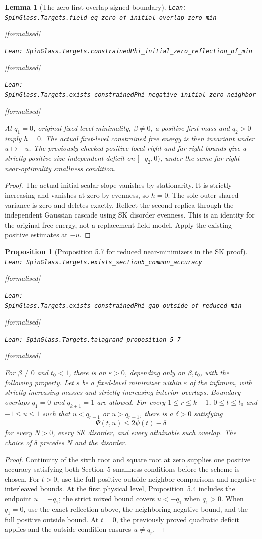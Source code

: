 \documentclass[11pt]{article}
\providecommand{\lean}[1]{\leavevmode\par\nopagebreak
  {\noindent\normalfont\footnotesize\raggedright\texttt{Lean: #1}\par}\nopagebreak}
\providecommand{\leanok}{\par\nopagebreak
  {\noindent\normalfont\footnotesize\textcolor{green!50!black}{[formalised]}\par}\nopagebreak}
\newtheorem{proposition}[theorem]{Proposition}
\newtheorem{lemma}[theorem]{Lemma}
\begin{document}
\begin{lemma}[The zero-first-overlap signed boundary]
\lean{SpinGlass.Targets.field\_eq\_zero\_of\_initial\_overlap\_zero\_min}\leanok
\lean{SpinGlass.Targets.constrainedPhi\_initial\_zero\_reflection\_of\_min}\leanok
\lean{SpinGlass.Targets.exists\_constrainedPhi\_negative\_initial\_zero\_neighbor}\leanok
At $q_1=0$, original fixed-level minimality, $\beta\ne0$, a positive
first mass and $q_2>0$ imply $h=0$. The actual first-level constrained
free energy is then invariant under $u\mapsto-u$. The previously checked
positive local-right and far-right bounds give a strictly positive
size-independent deficit on $[-q_2,0)$, under the same far-right
near-optimality smallness condition.
\end{lemma}
\begin{proof}
The actual initial scalar slope vanishes by stationarity. It is strictly
increasing and vanishes at zero by evenness, so $h=0$. The sole outer
shared variance is zero and deletes exactly. Reflect the second replica
through the independent Gaussian cascade using SK disorder evenness.
This is an identity for the original free energy, not a replacement field
model. Apply the existing positive estimates at $-u$.
\end{proof}

\begin{proposition}[Proposition 5.7 for reduced near-minimizers in the SK proof]
\lean{SpinGlass.Targets.exists\_section5\_common\_accuracy}\leanok
\lean{SpinGlass.Targets.exists\_constrainedPhi\_gap\_outside\_of\_reduced\_min}\leanok
\lean{SpinGlass.Targets.talagrand\_proposition\_5\_7}\leanok
For $\beta\ne0$ and $t_0<1$, there is an $\varepsilon>0$, depending
only on $\beta,t_0$, with the following property. Let $s$ be a fixed-level
minimizer within $\varepsilon$ of the infimum, with strictly increasing
masses and strictly increasing interior overlaps. Boundary overlaps
$q_1=0$ and $q_{k+1}=1$ are allowed. For every $1\le r\le k+1$,
$0\le t\le t_0$ and $-1\le u\le1$ such that
$u<q_{r-1}$ or $u>q_{r+1}$, there is a $\delta>0$ satisfying
\[
  \Psi(t,u)\le 2\psi(t)-\delta
\]
for every $N>0$, every SK disorder, and every attainable such overlap.
The choice of $\delta$ precedes $N$ and the disorder.
\end{proposition}
\begin{proof}
Continuity of the sixth root and square root at zero supplies one positive
accuracy satisfying both Section~5 smallness conditions before the scheme
is chosen. For $t>0$, use the full positive outside-neighbor comparisons
and negative interleaved bounds. At the first physical level, Proposition~5.4
includes the endpoint $u=-q_1$; the strict mixed bound covers $u<-q_1$
when $q_1>0$. When $q_1=0$, use the exact reflection above, the neighboring
negative bound, and the full positive outside bound. At $t=0$, the previously
proved quadratic deficit applies and the outside condition ensures $u\ne q_r$.
\end{proof}
\end{document}
